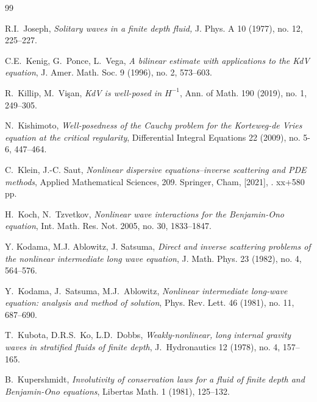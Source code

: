 \documentclass[letterpaper, 11pt,  reqno]{amsart}
\newcommand{\1}{\hspace{0.5mm}\textup{I}\hspace{0.5mm}}
\numberwithin{equation}{section}
\numberwithin{theorem}{section}
\begin{document}
\begin{thebibliography}{99}
	
R.I.~Joseph, {\it Solitary waves in a finite depth fluid,} J. Phys. A 10 (1977), no. 12, 225--227.
	


%	




C.E.~Kenig, G.~Ponce, L.~Vega,
{\it A bilinear estimate with applications to the KdV equation},
J. Amer. Math. Soc. 9 (1996), no. 2, 573--603.




R.~Killip, M.~Vi\c{s}an, 
{\it KdV is well-posed in $H^{-1}$}, 
Ann. of Math. 190 (2019), no. 1, 249--305.



N.~Kishimoto,
{\it Well-posedness of the Cauchy problem for the Korteweg-de Vries equation at the critical regularity}, Differential Integral Equations 22 (2009), no. 5-6, 447--464.







C.~Klein, J.-C. Saut, 
{\it Nonlinear dispersive equations--inverse scattering and PDE methods}, 
Applied Mathematical Sciences, 209. Springer, Cham, [2021], . xx+580 pp.


H.~Koch, N.~Tzvetkov, 
{\it Nonlinear wave interactions for the Benjamin-Ono equation},
Int. Math. Res. Not. 2005, no. 30, 1833--1847. 


Y. Kodama, M.J. Ablowitz, J. Satsuma,
{\it Direct and inverse scattering problems of the nonlinear intermediate long wave equation},
J. Math. Phys. 23 (1982), no. 4, 564--576.


Y.~Kodama, J.~Satsuma, M.J.~Ablowitz,
{\it Nonlinear intermediate long-wave equation: analysis and method of solution}, 
Phys. Rev. Lett. 46 (1981), no. 11, 687--690.




T.~Kubota, D.R.S.~Ko, L.D.~Dobbs, 
 {\it  Weakly-nonlinear, long internal gravity waves in stratified fluids of finite depth},
J.~Hydronautics 12 (1978), no. 4, 157--165.
%





	
B.~Kupershmidt, \textit{Involutivity of conservation laws for a fluid of finite depth and Benjamin-Ono equations},
Libertas Math. 1 (1981), 125--132. 
	
	
	



\end{thebibliography}
\end{document}

